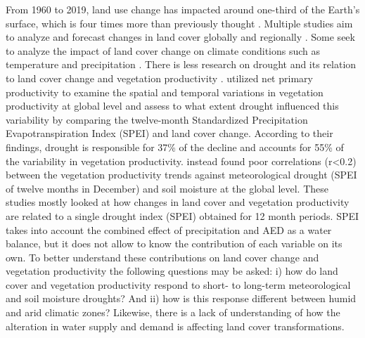 \documentclass[
  authoryear,
  preprint,
  3p,
  onecolumn]{elsarticle}
\begin{document}
From 1960 to 2019, land use change has impacted around one-third of the
Earth's surface, which is four times more than previously thought
\citep{Winkler2021}. Multiple studies aim to analyze and forecast
changes in land cover globally \citep{Winkler2021, Song2018} and
regionally
\citep{Chamling2020, Homer2020, Yang2021, Schulz2010, Echeverria2012}.
Some seek to analyze the impact of land cover change on climate
conditions such as temperature and precipitation
\citep{Luyssaert2014, Pitman2012}. There is less research on drought and
its relation to land cover change and vegetation productivity
\citep{Chen2022, Akinyemi2021, Peng2017}. \citet{Peng2017} utilized net
primary productivity to examine the spatial and temporal variations in
vegetation productivity at global level and assess to what extent
drought influenced this variability by comparing the twelve-month
Standardized Precipitation Evapotranspiration Index (SPEI) and land
cover change. According to their findings, drought is responsible for
37\% of the decline and accounts for 55\% of the variability in
vegetation productivity. \citet{Chen2022} instead found poor
correlations (r\textless0.2) between the vegetation productivity trends
against meteorological drought (SPEI of twelve months in December) and
soil moisture at the global level. These studies mostly looked at how
changes in land cover and vegetation productivity are related to a
single drought index (SPEI) obtained for 12 month periods. SPEI takes
into account the combined effect of precipitation and AED as a water
balance, but it does not allow to know the contribution of each variable
on its own. To better understand these contributions on land cover
change and vegetation productivity the following questions may be asked:
i) how do land cover and vegetation productivity respond to short- to
long-term meteorological and soil moisture droughts? And ii) how is this
response different between humid and arid climatic zones? Likewise,
there is a lack of understanding of how the alteration in water supply
and demand is affecting land cover transformations.
\end{document}

